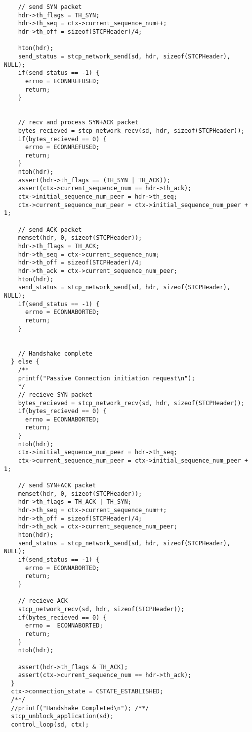 \documentclass[11pt]{article}
\begin{document}
\begin{verbatim}
    // send SYN packet
    hdr->th_flags = TH_SYN;
    hdr->th_seq = ctx->current_sequence_num++;
    hdr->th_off = sizeof(STCPHeader)/4;

    hton(hdr);
    send_status = stcp_network_send(sd, hdr, sizeof(STCPHeader), NULL);
    if(send_status == -1) {
      errno = ECONNREFUSED;
      return;
    }


    // recv and process SYN+ACK packet
    bytes_recieved = stcp_network_recv(sd, hdr, sizeof(STCPHeader));
    if(bytes_recieved == 0) {
      errno = ECONNREFUSED;
      return;
    }
    ntoh(hdr);
    assert(hdr->th_flags == (TH_SYN | TH_ACK));
    assert(ctx->current_sequence_num == hdr->th_ack);
    ctx->initial_sequence_num_peer = hdr->th_seq;
    ctx->current_sequence_num_peer = ctx->initial_sequence_num_peer + 1;

    // send ACK packet
    memset(hdr, 0, sizeof(STCPHeader));
    hdr->th_flags = TH_ACK;
    hdr->th_seq = ctx->current_sequence_num;
    hdr->th_off = sizeof(STCPHeader)/4;
    hdr->th_ack = ctx->current_sequence_num_peer;
    hton(hdr);
    send_status = stcp_network_send(sd, hdr, sizeof(STCPHeader), NULL);
    if(send_status == -1) {
      errno = ECONNABORTED;
      return;
    }


    // Handshake complete
  } else {
    /**
    printf("Passive Connection initiation request\n");
    */
    // recieve SYN packet
    bytes_recieved = stcp_network_recv(sd, hdr, sizeof(STCPHeader));
    if(bytes_recieved == 0) {
      errno = ECONNABORTED;
      return;
    }
    ntoh(hdr);
    ctx->initial_sequence_num_peer = hdr->th_seq;
    ctx->current_sequence_num_peer = ctx->initial_sequence_num_peer + 1;

    // send SYN+ACK packet
    memset(hdr, 0, sizeof(STCPHeader));
    hdr->th_flags = TH_ACK | TH_SYN;
    hdr->th_seq = ctx->current_sequence_num++;
    hdr->th_off = sizeof(STCPHeader)/4;
    hdr->th_ack = ctx->current_sequence_num_peer;
    hton(hdr);
    send_status = stcp_network_send(sd, hdr, sizeof(STCPHeader), NULL);
    if(send_status == -1) {
      errno = ECONNABORTED;
      return;
    }

    // recieve ACK
    stcp_network_recv(sd, hdr, sizeof(STCPHeader));
    if(bytes_recieved == 0) {
      errno =  ECONNABORTED;
      return;
    }
    ntoh(hdr);

    assert(hdr->th_flags & TH_ACK);
    assert(ctx->current_sequence_num == hdr->th_ack);
  }
  ctx->connection_state = CSTATE_ESTABLISHED;
  /**/
  //printf("Handshake Completed\n"); /**/
  stcp_unblock_application(sd);
  control_loop(sd, ctx);


\end{verbatim}
\end{document}

